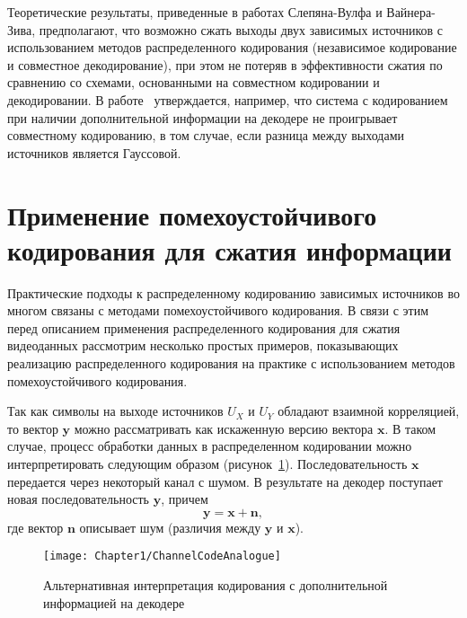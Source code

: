 Теоретические результаты, приведенные в работах Слепяна-Вулфа и Вайнера-Зива, предполагают, что возможно сжать выходы двух зависимых источников с использованием методов распределенного кодирования (независимое кодирование и совместное декодирование), при этом не потеряв в эффективности сжатия по сравнению со схемами, основанными на совместном кодировании и декодировании. В работе~\cite{Pradhan2003} утверждается, например, что система с кодированием при наличии дополнительной информации на декодере не проигрывает совместному кодированию, в том случае, если разница между выходами источников является Гауссовой.

\section{Применение помехоустойчивого кодирования для сжатия информации}\label{chap1:2}
Практические подходы к распределенному кодированию зависимых источников во многом связаны с методами помехоустойчивого кодирования. В связи с этим перед описанием применения распределенного кодирования для сжатия видеоданных рассмотрим несколько простых примеров, показывающих реализацию распределенного кодирования на практике с использованием методов помехоустойчивого кодирования.

Так как символы на выходе источников $U_X$ и $U_Y$ обладают взаимной корреляцией, то вектор $\mathbf{y}$ можно рассматривать как искаженную версию вектора $\mathbf{x}$. В таком случае, процесс обработки данных в распределенном кодировании можно интерпретировать следующим образом (рисунок~\ref{fig:ChannelCodeAnalogue}). Последовательность $\mathbf{x}$ передается через некоторый канал с шумом. В результате на декодер поступает новая последовательность $\mathbf{y}$, причем
\begin{equation*}
\mathbf{y} = \mathbf{x} + \mathbf{n},
\end{equation*}
где вектор $\mathbf{n}$ описывает шум (различия между $\mathbf{y}$ и $\mathbf{x}$).

\begin{figure}[htbp]
\begin{center}
\texttt{[image: Chapter1/ChannelCodeAnalogue]}
\caption{Альтернативная интерпретация кодирования с дополнительной информацией на декодере}
\label{fig:ChannelCodeAnalogue}
\end{center}
\end{figure}


